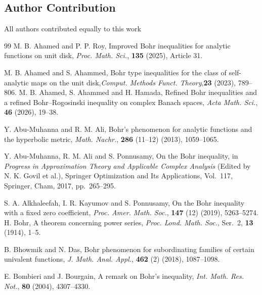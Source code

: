 \documentclass[11pt, reqno]{amsart}
\newtheorem*{cor A}{Corollary A}
\newtheorem*{cor B}{Corollary B}
\numberwithin{equation}{section}
\begin{document}
\subsection*{Author Contribution} All authors contributed equally to this work
\begin{thebibliography}{99}
 {\sc M. B. Ahamed and P. P. Roy}, Improved Bohr inequalities for analytic functions on unit disk,
\textit{Proc. Math. Sci.}, \textbf{135} (2025), Article 31.

  {\sc M. B. Ahamed and S. Ahammed}, Bohr type inequalities for the class of self-analytic maps on the unit disk,\textit{Comput. Methods Funct. Theory},\textbf{23} (2023), 789--806.
 {\sc M. B. Ahamed, S. Ahammed and H. Hamada}, Refined Bohr inequalities and a refined Bohr--Rogosinski inequality on complex Banach spaces, \textit{Acta Math. Sci.}, \textbf{46} (2026), 19--38.

 {\sc Y. Abu-Muhanna and R. M. Ali}, Bohr's phenomenon for analytic functions and the hyperbolic metric, \textit{Math. Nachr.}, \textbf{286} (11--12) (2013), 1059--1065.

 {\sc Y. Abu-Muhanna, R. M. Ali and S. Ponnusamy}, On the Bohr inequality, in \textit{Progress in Approximation Theory and Applicable Complex Analysis} (Edited by N. K. Govil et al.), Springer Optimization and Its Applications, Vol.~117, Springer, Cham, 2017, pp.~265--295.

 {\sc S. A. Alkhaleefah, I. R. Kayumov and S. Ponnusamy}, On the Bohr inequality with a fixed zero coefficient, \textit{Proc. Amer. Math. Soc.}, \textbf{147} (12) (2019), 5263--5274.
 {\sc H. Bohr}, A theorem concerning power series, \textit{Proc. Lond. Math. Soc.}, Ser.~2, \textbf{13} (1914), 1--5.

 {\sc B. Bhowmik and N. Das}, Bohr phenomenon for subordinating families of certain univalent functions, \textit{J. Math. Anal. Appl.}, \textbf{462} (2) (2018), 1087--1098.

 {\sc E. Bombieri and J. Bourgain}, A remark on Bohr's inequality, \textit{Int. Math. Res. Not.}, \textbf{80} (2004), 4307--4330.




\end{thebibliography}
\end{document}
